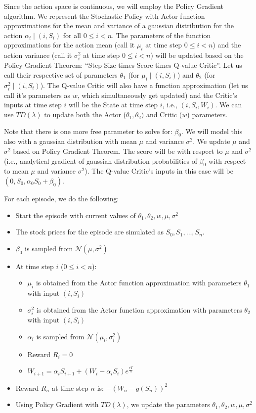 \documentclass[12pt]{exam}
\begin{document}
\begin{questions}
Since the action space is continuous, we will employ the Policy Gradient algorithm. We represent the Stochastic Policy with Actor function approximations for the mean and variance of a gaussian distribution for the action $\alpha_i \mid (i, S_i)$ for all $0 \leq i < n$. The parameters of the function approximations for the action mean (call it $\mu_i$ at time step $0 \leq i < n$) and the action variance (call it $\sigma_i^2$ at time step $0 \leq i < n$) will be updated based on the Policy Gradient Theorem: ``Step Size times Score times Q-value Critic''. Let us call their respective set of parameters $\theta_1$ (for $\mu_i \mid (i, S_i)$) and $\theta_2$ (for $\sigma_i^2 \mid (i, S_i)$). The Q-value Critic will also have a function approximation (let us call it's parameters as $w$, which simultaneously get updated) and the Critic's inputs at time step $i$ will be the State at time step $i$, i.e., $(i, S_i, W_i)$. We can use $TD(\lambda)$ to update both the Actor ($\theta_1, \theta_2)$ and Critic ($w$) parameters.

Note that there is one more free parameter to solve for: $\beta_0$. We will model this also with a gaussian distribution with mean $\mu$ and variance $\sigma^2$. We update $\mu$ and $\sigma^2$ based on Policy Gradient Theorem. The score will be with respect to $\mu$ and $\sigma^2$ (i.e., analytical gradient of gaussian distribution probabilities of $\beta_0$ with respect to mean $\mu$ and variance $\sigma^2$). The Q-value Critic's inputs in this case will be $(0, S_0, \alpha_0 S_0 + \beta_0)$.

For each episode, we do the following:

\begin{itemize}
\item Start the episode with current values of $\theta_1, \theta_2,  w, \mu, \sigma^2$
\item The stock prices for the episode are simulated as $S_0, S_1, \ldots, S_n$.
\item $\beta_0$ is sampled from $\mathcal{N}(\mu, \sigma^2)$
\item At time step $i$ ($0 \leq i < n$):
\begin{itemize}
\item $\mu_i$ is obtained from the Actor function approximation with parameters $\theta_1$ with input $(i, S_i)$
\item $\sigma_i^2$ is obtained from the Actor function approximation with parameters $\theta_2$ with input $(i, S_i)$
\item $\alpha_i$ is sampled from $\mathcal{N}(\mu_i, \sigma_i^2)$
\item Reward $R_i = 0$
\item $W_{i+1} = \alpha_i S_{i+1} + (W_i - \alpha_i S_i) e^{\frac {rT} n}$
\end{itemize}
\item Reward $R_n$ at time step $n$ is: $-(W_n - g(S_n))^2$
\item Using Policy Gradient with $TD(\lambda)$, we update the parameters $\theta_1, \theta_2, w, \mu, \sigma^2$
\end{itemize}

\end{questions}
\end{document}
